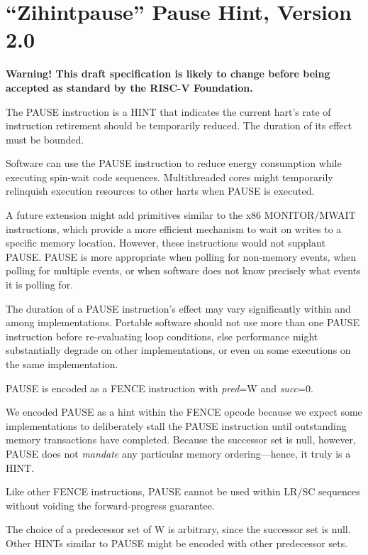 \chapter{``Zihintpause'' Pause Hint, Version 2.0}
\label{chap:zihintpause}

{\bf Warning! This draft specification is likely to change before being
accepted as standard by the RISC-V Foundation.}

The PAUSE instruction is a HINT that indicates the current hart's rate of
instruction retirement should be temporarily reduced.  The duration of its
effect must be bounded.

\begin{commentary}
Software can use the PAUSE instruction to reduce energy consumption while
executing spin-wait code sequences.  Multithreaded cores might temporarily
relinquish execution resources to other harts when PAUSE is executed.

A future extension might add primitives similar to the x86 MONITOR/MWAIT
instructions, which provide a more efficient mechanism to wait on writes to
a specific memory location.
However, these instructions would not supplant PAUSE.
PAUSE is more appropriate when polling for non-memory events, when polling for
multiple events, or when software does not know precisely what events it is
polling for.

The duration of a PAUSE instruction's effect may vary significantly within and
among implementations.
Portable software should not use more than one PAUSE instruction before
re-evaluating loop conditions, else performance might substantially degrade on
other implementations, or even on some executions on the same implementation.
\end{commentary}

PAUSE is encoded as a FENCE instruction with {\em pred}=W and {\em succ}=0.

\begin{commentary}
We encoded PAUSE as a hint within the FENCE opcode because we expect some
implementations to deliberately stall the PAUSE instruction until outstanding
memory transactions have completed.
Because the successor set is null, however, PAUSE does not {\em mandate} any
particular memory ordering---hence, it truly is a HINT.

Like other FENCE instructions, PAUSE cannot be used within LR/SC sequences
without voiding the forward-progress guarantee.

The choice of a predecessor set of W is arbitrary, since the successor set is
null.
Other HINTs similar to PAUSE might be encoded with other predecessor sets.
\end{commentary}
